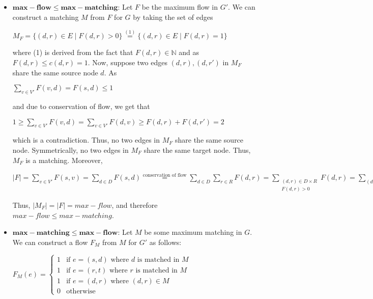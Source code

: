 \documentclass{article}
\begin{document}
\begin{enumerate}[label=(\alph*)]
\begin{enumerate}[label=(\roman*)]
        \begin{itemize}
            \item $\mathbf{max-flow \leq max-matching}$: Let $F$ be the maximum flow in $G'$. We can construct a matching $M$ from $F$ for $G$ by taking the set of edges 
            
            \begin{center}
            $M_F = \{(d, r) \in E \mid F(d, r) > 0 \} \overset{(1)}{=} \{(d, r) \in E \mid F(d, r) = 1 \}$
            \end{center}
            
            where (1) is derived from the fact that $F(d, r) \in \mathbb{N}$ and as $F(d, r) \leq c(d, r) = 1$. Now, suppose two edges $(d, r), (d, r')$ in $M_F$ share the same source node $d$. As 
            
            \begin{center}
            $\sum_{v \in V'}{F(v, d)} = F(s, d) \leq 1$
            \end{center}
            and due to conservation of flow, we get that 
            
            \begin{center}
            $1 \geq \sum_{v \in V'}{F(v, d)} = \sum_{v \in V'}{F(d, v)} \geq F(d, r) + F(d, r') = 2$
            \end{center}
            which is a contradiction. Thus, no two edges in $M_F$ share the same source node. Symmetrically, no two edges in $M_F$ share the same target node. Thus, $M_F$ is a matching. Moreover, 
            
            \begin{center}
            $|F| = \sum_{v \in V'}{F(s, v)} = \sum_{d \in D}{F(s, d)} \overset{\text{conservation of flow}}{=} \sum_{d \in D}{\sum_{r \in R}{F(d, r)}} = \sum_{\substack{(d, r) \in D \times R \\ F(d, r) > 0}}{F(d, r)} = \sum_{(d, r) \in M_F}{F(d, r)} = \sum_{(d, r) \in M_F}{1} = |M_F|$
            \end{center}
            Thus, $|M_F| = |F| = max-flow$, and therefore $max-flow \leq max-matching$.

            \item $\mathbf{max-matching \leq max-flow}$: Let $M$ be some maximum matching in $G$. We can construct a flow $F_M$ from $M$ for $G'$ as follows:
        
            \begin{center}
                $F_M(e) = \begin{cases}
                    1 & \text{if $e = (s, d)$ where $d$ is matched in $M$}\\
                    1 & \text{if $e = (r, t)$ where $r$ is matched in $M$}\\
                    1 & \text{if $e = (d, r)$ where $(d, r) \in M$}\\
                    0 & \text{otherwise}
                \end{cases}$
            \end{center}
            

\end{itemize}
\end{enumerate}
\end{enumerate}
\end{document}
